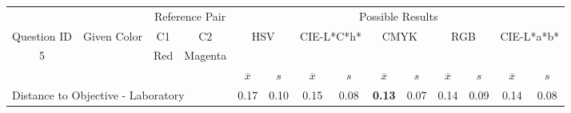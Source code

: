 \begin{table}[H]
  \resizebox{\textwidth}{!} {
  \begin{tabular}{lccccccccccccc}
    \hline
    \multicolumn{1}{c}{}                              &                                      & \multicolumn{2}{c}{Reference Pair}                   & \multicolumn{10}{c}{Possible Results}                                                                                                                                                                                                                                                                                        \\ \cline{3-14}
    \multicolumn{1}{c}{\multirow{-2}{*}{Question ID}} & \multirow{-2}{*}{Given Color}        & C1                       & C2                         & \multicolumn{2}{c}{HSV}                                        & \multicolumn{2}{c}{CIE-L*C*h*}                                 & \multicolumn{2}{c}{CMYK}                                       & \multicolumn{2}{c}{RGB}                                        & \multicolumn{2}{c}{CIE-L*a*b*}                                 \\ \hline
    \multicolumn{1}{c}{5}                             & \cellcolor[HTML]{FF0080}{\color[HTML]{FFFFFF}(45, 23, 22)} & \multicolumn{1}{c|}{Red} & \multicolumn{1}{c|}{Magenta}  & \multicolumn{2}{c|}{\cellcolor[HTML]{FF0080}{\color[HTML]{FFFFFF}(45, 23, 22)}}      & \multicolumn{2}{c|}{\cellcolor[HTML]{FF0080}{\color[HTML]{FFFFFF}(45, 23, 22)}}       & \multicolumn{2}{c|}{\cellcolor[HTML]{FF0080}{\color[HTML]{FFFFFF}(45, 23, 22)}}       & \multicolumn{2}{c|}{\cellcolor[HTML]{FF0080}{\color[HTML]{FFFFFF}(45, 23, 22)}}       & \multicolumn{2}{c|}{\cellcolor[HTML]{FF0087}{\color[HTML]{FFFFFF}(45, 23, 25)}}       \\ \hline
                                                      & \multicolumn{1}{l}{}                 & \multicolumn{1}{l}{}     & \multicolumn{1}{l}{}       & \multicolumn{1}{c}{$\overline{x}$} & \multicolumn{1}{c}{$s$} & \multicolumn{1}{c}{$\overline{x}$} & \multicolumn{1}{c}{$s$} & \multicolumn{1}{c}{$\overline{x}$} & \multicolumn{1}{c}{$s$} & \multicolumn{1}{c}{$\overline{x}$} & \multicolumn{1}{c}{$s$} & \multicolumn{1}{c}{$\overline{x}$} & \multicolumn{1}{c}{$s$} \\ \hline
    \multicolumn{4}{l}{Distance to Objective - Laboratory}                                                                                           & \multicolumn{1}{|c}{0.17}       & \multicolumn{1}{c|}{0.10}    & \multicolumn{1}{|c}{0.15}       & \multicolumn{1}{c|}{0.08}    & \multicolumn{1}{|c}{\textbf{0.13}}       & \multicolumn{1}{c|}{0.07}    & \multicolumn{1}{|c}{0.14}       & \multicolumn{1}{c|}{0.09}    & \multicolumn{1}{|c}{0.14}       & \multicolumn{1}{c|}{0.08}    \\

\end{tabular}}
\end{table}
